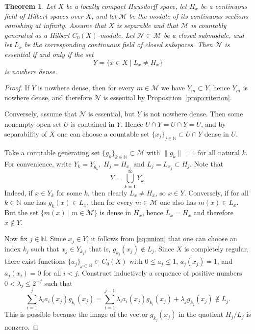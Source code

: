 \documentclass[10pt,a4paper]{amsart}
\newtheorem{theorem}{Theorem}
\newcommand{\M}{\mathcal M}
\newcommand{\N}{\mathcal N}
\newcommand{\NN}{\mathbb N}
\renewcommand{\leq}{\leqslant}
\begin{document}
	\begin{theorem}
		\label{thm:criterion}
		Let $X$ be a locally compact Hausdorff space, let $H_x$ be a continuous field of Hilbert spaces over $X$, and let $\M$ be the module of its continuous sections vanishing at infinity.
		Assume that $X$ is separable and that $\M$ is countably generated as a Hilbert $C_0(X)$-module.
		Let $\N \subset \M$ be a closed submodule, and let $L_x$ be the corresponding continuous field of closed subspaces.
		Then $\N$ is essential if and only if the set 
		\[Y = \{x \in X \mid L_x \ne H_x\}\]
		is nowhere dense.
	\end{theorem}

	\begin{proof}
		If $Y$ is nowhere dense, then for every $m \in \M$ we have $Y_m \subset Y$, hence $Y_m$ is nowhere dense, and therefore $\N$ is essential by Proposition~\ref{prop:criterion}.
		
		Conversely, assume that $\N$ is essential, but $Y$ is not nowhere dense. Then some nonempty open set $U$ is contained in $\overline Y$.
		Hence $\overline{U \cap Y} = \overline{U \cap \overline Y} = \overline U$, and by separability of $X$ one can choose a countable set $\{x_j\}_{j \in \NN} \subset U \cap Y$ dense in $U$.
		
		Take a countable generating set $\{g_k\}_{k \in \NN} \subset \M$ with $\|g_k\| = 1$ for all natural $k$.
		For convenience, write $Y_k = Y_{g_k},\; H_j = H_{x_j}$ and $L_j = L_{x_j} \subset H_j$.
		Note that
		\begin{equation}
			\label{eq:union}
			Y = \bigcup_{k=1}^\infty Y_k.
		\end{equation}
		Indeed, if $x \in Y_k$ for some $k$, then clearly $L_x \ne H_x$, so $x \in Y$.
		Conversely, if for all $k \in \NN$ one has $g_k(x) \in L_x$, then for every $m \in \M$ one also has $m(x) \in L_x$.
		But the set $\{m(x) \mid m \in \M\}$ is dense in $H_x$, hence $L_x = H_x$ and therefore $x \notin Y$.
		
		Now fix $j \in \NN$. Since $x_j \in Y$, it follows from \eqref{eq:union} that one can choose an index $k_j$ such that $x_j \in Y_{k_j}$, that is, $g_{k_j}(x_j) \notin L_j$.
		Since $X$ is completely regular, there exist functions $\{a_j\}_{j \in \NN} \subset C_0(X)$ with $0 \leq a_j \leq 1$, $a_j(x_j) = 1$, and $a_j(x_i) = 0$ for all $i < j$.
		Construct inductively a sequence of positive numbers $0 < \lambda_j \leq 2^{-j}$ such that
		\begin{equation}
			\label{eq:induction}
			\sum_{i=1}^j\lambda_ia_i(x_j)g_{k_i}(x_j) = \sum_{i=1}^{j-1}\lambda_ia_i(x_j)g_{k_i}(x_j) + \lambda_jg_{k_j}(x_j) \notin L_j. 
		\end{equation}
		This is possible because the image of the vector $g_{k_j}(x_j)$ in the quotient $H_j / L_j$ is nonzero.
		

\end{proof}
\end{document}
